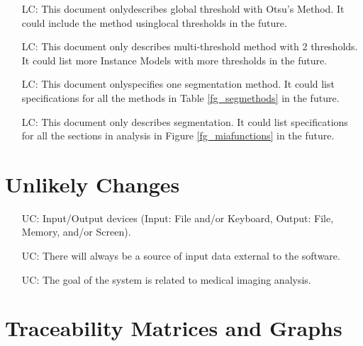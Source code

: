 \documentclass[12pt]{article}
\begin{document}
\noindent \begin{itemize}

\item[LC\refstepcounter{lcnum}\thelcnum\label{LC_localthres}:]This document
onlydescribes global threshold with Otsu's Method. It could include the method
usinglocal thresholds in the future.

\item[LC\refstepcounter{lcnum}\thelcnum\label{LC_morek}:]This document only
describes multi-threshold method with 2 thresholds. It could list more Instance
Models with more thresholds in the future.

\item[LC\refstepcounter{lcnum}\thelcnum\label{LC_allmethods}:]This document
onlyspecifies one segmentation method. It could list specifications for all the
methods in Table \ref{fg_segmethods} in the future.

\item[LC\refstepcounter{lcnum}\thelcnum\label{LC_allanalysis}:]This document
only describes segmentation. It could list specifications for all the sections
in analysis in Figure \ref{fg_miafunctions} in the future.

\end{itemize}

\section{Unlikely Changes}

\noindent
\begin{itemize}

\item[UC\refstepcounter{ucnum}\theucnum\label{uc_IO}:] Input/Output devices
(Input: File and/or Keyboard, Output: File, Memory, and/or Screen).

\item[UC\refstepcounter{ucnum}\theucnum\label{uc_Input}:] 
There will always be a source of input data external to the software.

\item[UC\refstepcounter{ucnum}\theucnum\label{uc_Goal}:] 
The goal of the system is related to medical imaging analysis.

\end{itemize}

\section{Traceability Matrices and Graphs}
\end{document}
